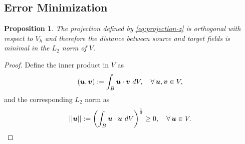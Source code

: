 \documentclass[12pt]{article}
\newcommand{\mbs}[1]{\boldsymbol{#1}}
\newtheorem*{proposition}{Proposition}
\def\bv{{\mbs{v}}} \def\bw{{\mbs{w}}} \def\bx{{\mbs{x}}}
\begin{document}
\subsection{Error Minimization}

\begin{proposition}
  The projection defined by \eqref{eq:projection-z} is orthogonal with
  respect to $V_h$ and therefore the distance between source and
  target fields is minimal in the $L_2$ norm of $V$.
\end{proposition}

\begin{proof}
Define the inner product in $V$ as
\begin{equation}
  (\bu, \bv) := \int_B \bu \cdot \bv \ dV,
  \quad
  \forall \, \bu, \bv \in V,
  \label{eq:inner-product}
\end{equation}
and the corresponding $L_2$ norm as
\begin{equation}
  ||\bu|| :=
  \left( \int_B \bu \cdot \bu \ dV \right)^{\frac{1}{2}}
  \ge 0,
  \quad
  \forall \, \bu \in V.
  \label{eq:norm}
\end{equation}


\end{proof}
\end{document}
